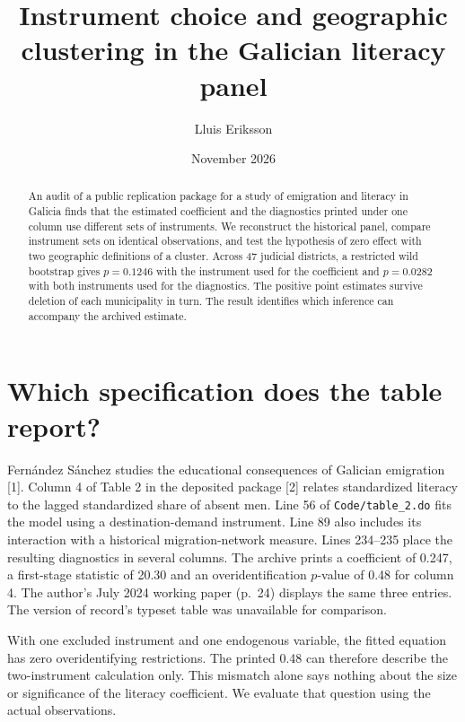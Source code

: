 \documentclass[10pt]{article}
\title{Instrument choice and geographic clustering in the Galician literacy panel}
\author{Lluis Eriksson}
\date{November 2026}
\begin{document}
\maketitle
\begin{abstract}
An audit of a public replication package for a study of emigration and literacy in Galicia finds that the estimated coefficient and the diagnostics printed under one column use different sets of instruments. We reconstruct the historical panel, compare instrument sets on identical observations, and test the hypothesis of zero effect with two geographic definitions of a cluster. Across 47 judicial districts, a restricted wild bootstrap gives $p=0.1246$ with the instrument used for the coefficient and $p=0.0282$ with both instruments used for the diagnostics. The positive point estimates survive deletion of each municipality in turn. The result identifies which inference can accompany the archived estimate.
\end{abstract}
\section{Which specification does the table report?}
Fern\'andez S\'anchez studies the educational consequences of Galician emigration [1]. Column 4 of Table 2 in the deposited package [2] relates standardized literacy to the lagged standardized share of absent men. Line 56 of \texttt{Code/table\_2.do} fits the model using a destination-demand instrument. Line 89 also includes its interaction with a historical migration-network measure. Lines 234--235 place the resulting diagnostics in several columns. The archive prints a coefficient of 0.247, a first-stage statistic of 20.30 and an overidentification $p$-value of 0.48 for column 4. The author's July 2024 working paper (p.~24) displays the same three entries. The version of record's typeset table was unavailable for comparison.

With one excluded instrument and one endogenous variable, the fitted equation has zero overidentifying restrictions. The printed 0.48 can therefore describe the two-instrument calculation only. This mismatch alone says nothing about the size or significance of the literacy coefficient. We evaluate that question using the actual observations.
\end{document}
